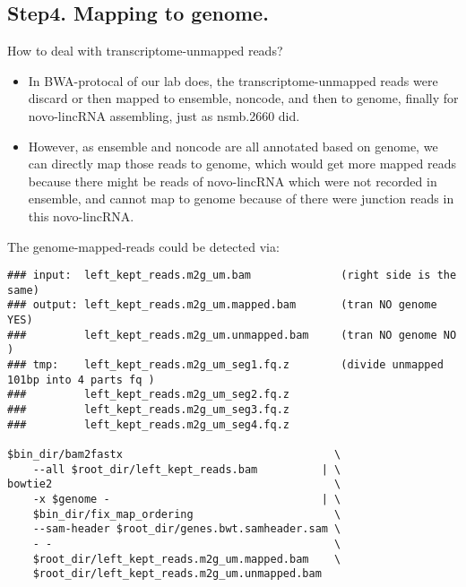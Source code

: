 \subsection{ Step4. Mapping to genome.} 
\begin{frame}[c,fragile]
	\begin{block}{ How to deal with \alert{transcriptome-unmapped} reads? }
		\begin{itemize}
			\item In BWA-protocal of our lab does, the transcriptome-unmapped reads were discard or then mapped to ensemble, noncode, and then to genome, finally for novo-lincRNA assembling, just as nsmb.2660 did.\\ \pause
			\item However, as ensemble and noncode  are all annotated based on genome, we can directly \alert{map those reads to genome}, which would get more mapped reads because there might be reads of novo-lincRNA which were not recorded in ensemble, and cannot map to genome because of there were \alert{junction reads in this novo-lincRNA}.
		\end{itemize}
	\end{block}
\end{frame}
\begin{frame}[c,fragile]
	\begin{block}{ The \alert{genome-mapped-reads} could be detected via: }
		\begin{lstlisting}[basicstyle=\tiny]
### input:  left_kept_reads.m2g_um.bam              (right side is the same)
### output: left_kept_reads.m2g_um.mapped.bam       (tran NO genome YES)
###         left_kept_reads.m2g_um.unmapped.bam     (tran NO genome NO )
### tmp:    left_kept_reads.m2g_um_seg1.fq.z        (divide unmapped 101bp into 4 parts fq )
###         left_kept_reads.m2g_um_seg2.fq.z
###         left_kept_reads.m2g_um_seg3.fq.z
###         left_kept_reads.m2g_um_seg4.fq.z

$bin_dir/bam2fastx                                 \
    --all $root_dir/left_kept_reads.bam          | \
bowtie2                                            \
    -x $genome -                                 | \
    $bin_dir/fix_map_ordering                      \
    --sam-header $root_dir/genes.bwt.samheader.sam \
    - -                                            \
    $root_dir/left_kept_reads.m2g_um.mapped.bam    \
    $root_dir/left_kept_reads.m2g_um.unmapped.bam
		\end{lstlisting}
	\end{block}
\end{frame}


